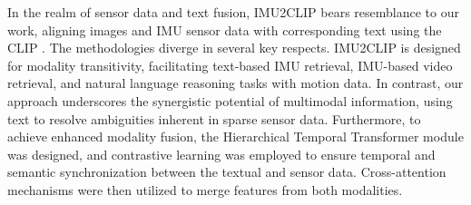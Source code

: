 \documentclass[letterpaper]{article} %
\begin{document}





In the realm of sensor data and text fusion, IMU2CLIP \cite{moon2022imu2clip} bears resemblance to our work, 
aligning images and IMU sensor data with corresponding text using the CLIP \cite{radford2021learning}.
The methodologies diverge in several key respects. IMU2CLIP is designed for modality transitivity, facilitating text-based IMU retrieval, IMU-based video retrieval, and natural language reasoning tasks with motion data. In contrast, our approach underscores the synergistic potential of multimodal information, using text to resolve ambiguities inherent in sparse sensor data. 
Furthermore, to achieve enhanced modality fusion, the Hierarchical Temporal Transformer module was designed, and contrastive learning was employed to ensure temporal and semantic synchronization between the textual and sensor data. Cross-attention mechanisms were then utilized to merge features from both modalities.
\end{document}
